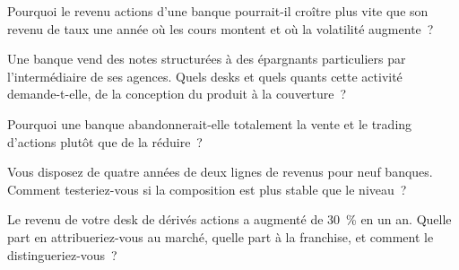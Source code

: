 \begin{interviewq}\label{iq:in:bank-markets-divisions:2}
Pourquoi le revenu actions d'une banque pourrait-il croître plus vite que son revenu de taux une année où les cours montent
et où la volatilité augmente~?
\end{interviewq}

\begin{interviewq}\label{iq:in:bank-markets-divisions:3}
Une banque vend des notes structurées à des épargnants particuliers par l'intermédiaire de ses agences. Quels desks et quels quants cette activité demande-t-elle,
de la conception du produit à la couverture~?
\end{interviewq}

\begin{interviewq}\label{iq:in:bank-markets-divisions:4}
Pourquoi une banque abandonnerait-elle totalement la vente et le trading d'actions plutôt que de la réduire~?
\end{interviewq}

\begin{interviewq}\label{iq:in:bank-markets-divisions:5}
Vous disposez de quatre années de deux lignes de revenus pour neuf banques. Comment testeriez-vous si la composition est plus stable
que le niveau~?
\end{interviewq}

\begin{interviewq}\label{iq:in:bank-markets-divisions:6}
Le revenu de votre desk de dérivés actions a augmenté de 30~\% en un an. Quelle part en attribueriez-vous au marché, quelle part
à la franchise, et comment le distingueriez-vous~?
\end{interviewq}
